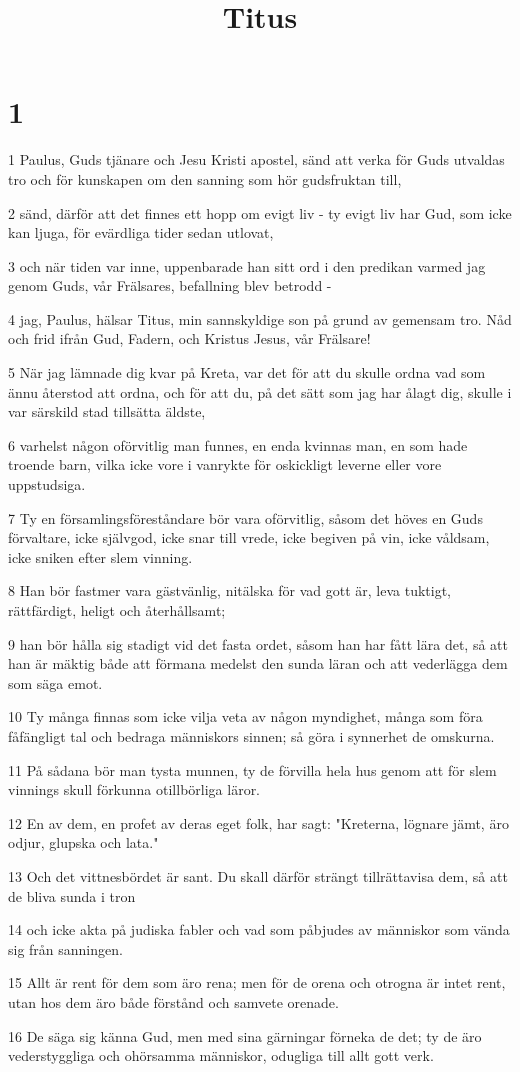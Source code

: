 

\title{Titus}


\chapter{1}

\par 1 Paulus, Guds tjänare och Jesu Kristi apostel, sänd att verka för Guds utvaldas tro och för kunskapen om den sanning som hör gudsfruktan till,
\par 2 sänd, därför att det finnes ett hopp om evigt liv - ty evigt liv har Gud, som icke kan ljuga, för evärdliga tider sedan utlovat,
\par 3 och när tiden var inne, uppenbarade han sitt ord i den predikan varmed jag genom Guds, vår Frälsares, befallning blev betrodd -
\par 4 jag, Paulus, hälsar Titus, min sannskyldige son på grund av gemensam tro. Nåd och frid ifrån Gud, Fadern, och Kristus Jesus, vår Frälsare!
\par 5 När jag lämnade dig kvar på Kreta, var det för att du skulle ordna vad som ännu återstod att ordna, och för att du, på det sätt som jag har ålagt dig, skulle i var särskild stad tillsätta äldste,
\par 6 varhelst någon oförvitlig man funnes, en enda kvinnas man, en som hade troende barn, vilka icke vore i vanrykte för oskickligt leverne eller vore uppstudsiga.
\par 7 Ty en församlingsföreståndare bör vara oförvitlig, såsom det höves en Guds förvaltare, icke självgod, icke snar till vrede, icke begiven på vin, icke våldsam, icke sniken efter slem vinning.
\par 8 Han bör fastmer vara gästvänlig, nitälska för vad gott är, leva tuktigt, rättfärdigt, heligt och återhållsamt;
\par 9 han bör hålla sig stadigt vid det fasta ordet, såsom han har fått lära det, så att han är mäktig både att förmana medelst den sunda läran och att vederlägga dem som säga emot.
\par 10 Ty många finnas som icke vilja veta av någon myndighet, många som föra fåfängligt tal och bedraga människors sinnen; så göra i synnerhet de omskurna.
\par 11 På sådana bör man tysta munnen, ty de förvilla hela hus genom att för slem vinnings skull förkunna otillbörliga läror.
\par 12 En av dem, en profet av deras eget folk, har sagt: "Kreterna, lögnare jämt, äro odjur, glupska och lata."
\par 13 Och det vittnesbördet är sant. Du skall därför strängt tillrättavisa dem, så att de bliva sunda i tron
\par 14 och icke akta på judiska fabler och vad som påbjudes av människor som vända sig från sanningen.
\par 15 Allt är rent för dem som äro rena; men för de orena och otrogna är intet rent, utan hos dem äro både förstånd och samvete orenade.
\par 16 De säga sig känna Gud, men med sina gärningar förneka de det; ty de äro vederstyggliga och ohörsamma människor, odugliga till allt gott verk.

